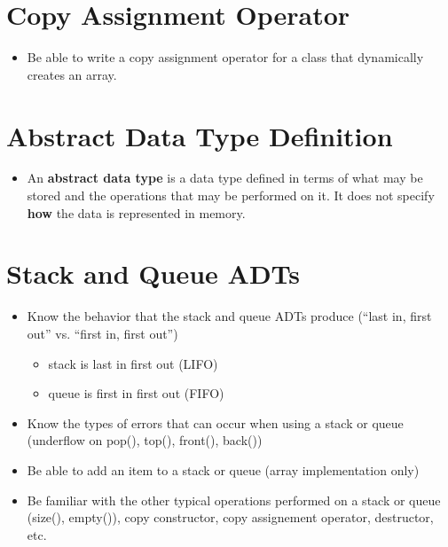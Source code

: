 \documentclass{report}
\begin{document}
  \section{Copy Assignment Operator}
  \begin{itemize}
    \item Be able to write a copy assignment operator for a class that dynamically creates an array.
  \end{itemize}
  \section{Abstract Data Type Definition}
  \begin{itemize}
    \item An \textbf{abstract data type} is a data type defined in terms of what may be stored and the operations that may be performed on it. It does not specify \textbf{how} the data is represented in memory.

  \end{itemize}
  \section{Stack and Queue ADTs}
  \begin{itemize}
    \item Know the behavior that the stack and queue ADTs produce (``last in, first out'' vs. ``first in, first out'')
      \begin{itemize}[label=$\circ$]
        \item stack is last in first out (LIFO)
        \item queue is first in first out (FIFO)
      \end{itemize}
    \item Know the types of errors that can occur when using a stack or queue (underflow on pop(), top(), front(), back())
    \item Be able to add an item to a stack or queue (array implementation only)
    \item Be familiar with the other typical operations performed on a stack or queue (size(), empty()), copy constructor, copy assignement operator, destructor, etc.
  \end{itemize}
\end{document}

